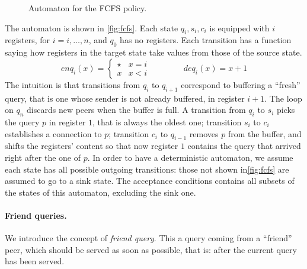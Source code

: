 \begin{figure}[t]
\caption{Automaton for the FCFS policy.}
\label{fig:fcfs}
\end{figure}
%
The automaton is shown in \autoref{fig:fcfs}. Each state $q_i,s_i,c_i$ is equipped with $i$ registers, for $i=i,\dots,n$, and $q_0$ has no registers. Each transition has a function saying how registers in the target state take values from those of the source state.
\[
	enq_i(x) = 
	\begin{cases}
		\star & x = i \\
		x & x < i
	\end{cases}
	\qquad
	\qquad
	deq_i(x) = x + 1
\]
%
The intuition is that transitions from $q_i$ to $q_{i+1}$ correspond to buffering a ``fresh'' query, that is one whose sender is not already buffered, in register $i+1$. The loop on $q_n$ discards new peers when the buffer is full. A transition from $q_i$ to $s_i$ picks the query $p$ in register $1$, that is always the oldest one; transition $s_i$ to $c_i$ establishes a connection to $p$; transition $c_i$ to $q_{i-1}$ removes $p$ from the buffer, and shifts the registers' content so that now register $1$ contains the query that arrived right after the one of $p$. In order to have a deterministic automaton, we assume each state has all possible outgoing transitions: those not shown in\autoref{fig:fcfs} are assumed to go to a sink state. The acceptance conditions contains all subsets of the states of this automaton, excluding the sink one.

%

\paragraph{Friend queries.} We introduce the concept of \emph{friend query}. This a query coming from a ``friend'' peer, which should be served as soon as possible, that is: after the current query has been served.
